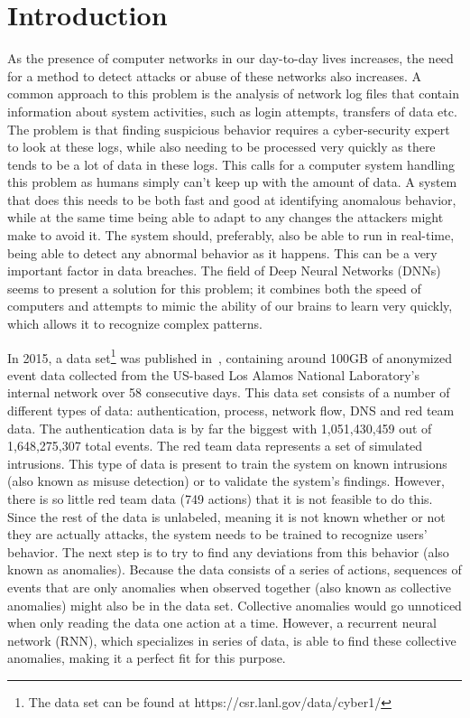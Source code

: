 \chapter{Introduction}\label{ch:introduction}
As the presence of computer networks in our day-to-day lives increases, the need for a method to detect attacks or abuse of these networks also increases. A common approach to this problem is the analysis of network log files that contain information about system activities, such as login attempts, transfers of data etc. The problem is that finding suspicious behavior requires a cyber-security expert to look at these logs, while also needing to be processed very quickly as there tends to be a lot of data in these logs. This calls for a computer system handling this problem as humans simply can't keep up with the amount of data. A system that does this needs to be both fast and good at identifying anomalous behavior, while at the same time being able to adapt to any changes the attackers might make to avoid it. The system should, preferably, also be able to run in real-time, being able to detect any abnormal behavior as it happens. This can be a very important factor in data breaches. The field of Deep Neural Networks (DNNs) seems to present a solution for this problem; it combines both the speed of computers and attempts to mimic the ability of our brains to learn very quickly, which allows it to recognize complex patterns.

In 2015, a data set\footnote{The data set can be found at https://csr.lanl.gov/data/cyber1/} was published in~\cite{akent-2015-enterprise-data}, containing around 100GB of anonymized event data collected from the US-based Los Alamos National Laboratory's internal network over 58 consecutive days. This data set consists of a number of different types of data: authentication, process, network flow, DNS and red team data. The authentication data is by far the biggest with 1,051,430,459 out of 1,648,275,307 total events. The red team data represents a set of simulated intrusions. This type of data is present to train the system on known intrusions (also known as misuse detection) or to validate the system's findings. However, there is so little red team data (749 actions) that it is not feasible to do this. Since the rest of the data is unlabeled, meaning it is not known whether or not they are actually attacks, the system needs to be trained to recognize users' behavior. The next step is to try to find any deviations from this behavior (also known as anomalies). Because the data consists of a series of actions, sequences of events that are only anomalies when observed together (also known as collective anomalies) might also be in the data set. Collective anomalies would go unnoticed when only reading the data one action at a time. However, a recurrent neural network (RNN), which specializes in series of data, is able to find these collective anomalies, making it a perfect fit for this purpose.

